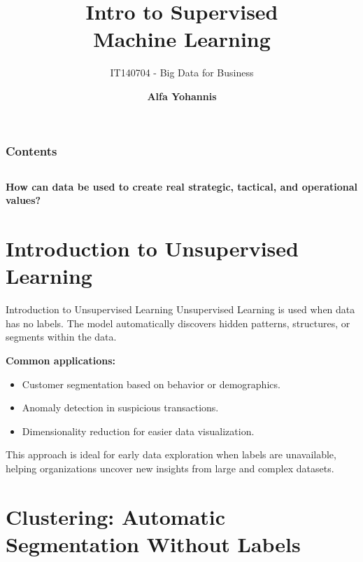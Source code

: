 \documentclass[aspectratio=169, table]{beamer}
\title{\Huge Intro to Supervised \\
\vspace{10pt}
Machine Learning}
\subtitle{IT140704 - Big Data for Business}
\author{\textbf{Alfa Yohannis}}
\begin{document}
\frame{\titlepage}


\begin{frame}[fragile]
\frametitle{Contents}
\vspace{20pt}
\begin{columns}[t]
	\tableofcontents[sections={1-5}]
	
	\tableofcontents[sections={6-20}]
\end{columns}
\end{frame}

\begin{frame}{\hfill}
	\centering
	\Huge{\textbf{How can data be used to create real strategic, tactical, and operational values?}}
\end{frame}


\section{Introduction to Unsupervised Learning}

\begin{frame}{Introduction to Unsupervised Learning}
	Unsupervised Learning is used when data has no labels. The model automatically discovers hidden patterns, structures, or segments within the data.
	
	\textbf{Common applications:}
	\begin{itemize}
		\item Customer segmentation based on behavior or demographics.
		\item Anomaly detection in suspicious transactions.
		\item Dimensionality reduction for easier data visualization.
	\end{itemize}
	
	This approach is ideal for early data exploration when labels are unavailable, helping organizations uncover new insights from large and complex datasets.
\end{frame}



\section{Clustering: Automatic Segmentation Without Labels}
\end{document}
